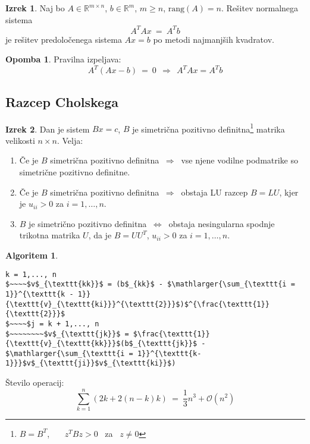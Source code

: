\documentclass[11pt]{article}
\theoremstyle{definition}
\newtheorem{izrek}{Izrek}
\newtheorem*{algoritem}{Algoritem}
\newtheorem*{opomba}{Opomba}
\begin{document}
\begin{izrek}

Naj bo $A \in \mathbb{R}^{m \times n}$, $b \in \mathbb{R}^m$, $m \geq n$, $\text{rang}(A) = n$. Rešitev normalnega sistema
$$A^T A x ~=~ A^T b$$
je rešitev predoločenega sistema $Ax = b$ po metodi najmanjših kvadratov.

\end{izrek}
\vspace{0.5cm}

\begin{opomba}

Pravilna izpeljava:
$$A^T(Ax-b) ~=~ 0 ~~\Rightarrow~~ A^T A x = A^T b$$

\end{opomba}
\vspace{0.5cm}


\subsection{Razcep Cholskega}
\vspace{0.5cm}

\begin{izrek}

Dan je sistem $Bx = c$, $B$ je simetrična pozitivno definitna\footnote{$B = B^T$, ~~~$z^T B z > 0$ ~za~ $z \neq 0$} matrika velikosti $n \times n$. Velja:
\begin{enumerate}

	\item Če je $B$ simetrična pozitivno definitna $~\Rightarrow~$ vse njene vodilne podmatrike so simetrične pozitivno definitne.
	
	\item Če je $B$ simetrična pozitivno definitna $~\Rightarrow~$ obstaja LU razcep $B = LU$, kjer je $u_{ii} > 0$ za $i = 1, \ldots, n$.
	
	\item $B$ je simetrično pozitivno definitna $~\iff~$ obstaja nesingularna spodnje trikotna matrika $U$, da je $B = U U^T$, $u_{ii} > 0$ za $i = 1, \ldots, n$.

\end{enumerate}

\end{izrek}
\vspace{0.5cm}

\begin{algoritem}
~
\begin{lstlisting}
k = 1,..., n
$~~~~$v$_{\texttt{kk}}$ = (b$_{kk}$ - $\mathlarger{\sum_{\texttt{i = 1}}^{\texttt{k - 1}}{\texttt{v}_{\texttt{ki}}}^{\texttt{2}}}$)$^{\frac{\texttt{1}}{\texttt{2}}}$
$~~~~$j = k + 1,..., n 
$~~~~~~~~$v$_{\texttt{jk}}$ = $\frac{\texttt{1}}{\texttt{v}_{\texttt{kk}}}$(b$_{\texttt{jk}}$ - $\mathlarger{\sum_{\texttt{i = 1}}^{\texttt{k-1}}}$v$_{\texttt{ji}}$v$_{\texttt{ki}}$)
\end{lstlisting}
Število operacij:
$$\sum_{k=1}^n \left( 2k + 2(n-k)k \right) ~=~ \frac{1}{3}n^3 + \mathcal{O}(n^2)$$
\end{algoritem}
\vspace{0.5cm}
\end{document}
